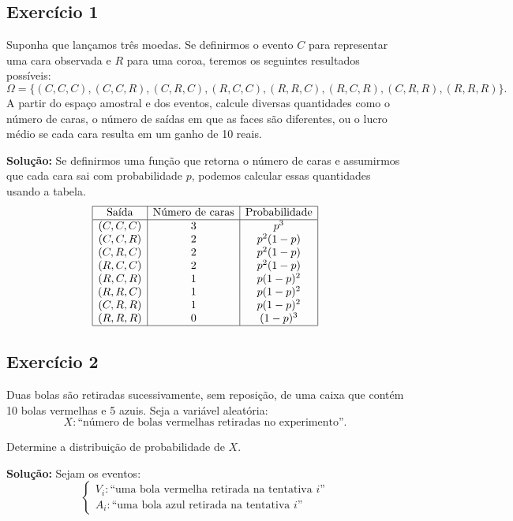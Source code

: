 \documentclass{article}
\begin{document}
\subsection{Exercício 1}
Suponha que lançamos três moedas. Se definirmos o evento $C$ para representar uma cara observada e $R$ para uma coroa, teremos os seguintes resultados possíveis:
    $$
    \Omega = \{(C,C,C), (C,C,R), (C,R,C), (R,C,C), (R,R,C), (R,C,R), (C,R,R), (R,R,R)\}.
    $$
A partir do espaço amostral e dos eventos, calcule diversas quantidades como o número de caras, o número de saídas em que as faces são diferentes, ou o lucro médio se cada cara resulta em um ganho de 10 reais.  

\vspace{0.5cm}
\textbf{Solução:}
Se definirmos uma função que retorna o número de caras e assumirmos que cada cara sai com probabilidade $p$, podemos calcular essas quantidades usando a tabela.
    $$
    \begin{array}{|c|c|c|}
    \hline
    \text{Saída} & \text{Número de caras} & \text{Probabilidade} \\
    \hline
    (C,C,C) & 3 & p^3 \\
    (C,C,R) & 2 & p^2(1-p) \\
    (C,R,C) & 2 & p^2(1-p) \\
    (R,C,C) & 2 & p^2(1-p) \\
    (R,C,R) & 1 & p(1-p)^2 \\
    (R,R,C) & 1 & p(1-p)^2 \\
    (C,R,R) & 1 & p(1-p)^2 \\
    (R,R,R) & 0 & (1-p)^3 \\
    \hline
    \end{array}
    $$

\subsection{Exercício 2}
Duas bolas são retiradas sucessivamente, sem reposição, de uma caixa que contém 10 bolas vermelhas e 5 azuis.  
Seja a variável aleatória:
    $$
    X : \text{``número de bolas vermelhas retiradas no experimento''}.
    $$

Determine a distribuição de probabilidade de $X$.

\vspace{0.5cm}
\textbf{Solução:} 
Sejam os eventos:
    $$
    \begin{cases}
    V_i: \text{``uma bola vermelha retirada na tentativa $i$''} \\
    A_i: \text{``uma bola azul retirada na tentativa $i$''}
    \end{cases}
    $$
\end{document}
